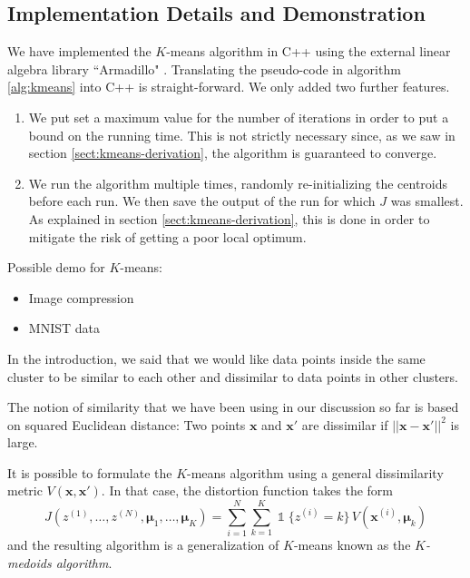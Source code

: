 \documentclass[final,3p,times,twocolumn]{elsarticle}
\let\bs\boldsymbol
\DeclareMathOperator*{\id}{\mathds{1}}
\begin{document}
\subsection{Implementation Details and Demonstration}
\label{sect:kmeans-code}
We have implemented the $K$-means algorithm in C++ using the external linear algebra library ``Armadillo" \cite{armadillo}.
Translating the pseudo-code in algorithm \ref{alg:kmeans} into C++ is straight-forward.
We only added two further features.
\begin{enumerate}
\item We put set a maximum value for the number of iterations in order to put a bound on the running time.
This is not strictly necessary since, as we saw in section \ref{sect:kmeans-derivation}, the algorithm is guaranteed to converge.
\item We run the algorithm multiple times, randomly re-initializing the centroids before each run.
We then save the output of the run for which $J$ was smallest.
As explained in section \ref{sect:kmeans-derivation}, this is done in order to mitigate the risk of getting a poor local optimum.
\end{enumerate}

Possible demo for $K$-means:
\begin{itemize}
\item Image compression
\item MNIST data
\end{itemize}


\label{sect:kmeans-concl}
In the introduction, we said that we would like data points inside the same cluster to be similar to each other and dissimilar to data points in other clusters.

The notion of similarity that we have been using in our discussion so far is based on squared Euclidean distance:
Two points $\bs x$ and $\bs x'$ are dissimilar if $||\bs x-\bs x'||^2$ is large.

It is possible to formulate the $K$-means algorithm using a general dissimilarity metric $V(\boldsymbol x, \boldsymbol x')$.
In that case, the distortion function takes the form
\begin{equation}
\label{eqn:kmedoid-distortion}
J(z^{(1)},\dots,z^{(N)},\bs \mu_1,\dots,\bs \mu_K) = \sum_{i=1}^N \sum_{k=1}^K \id\{z^{(i)}=k\}\,V(\bs x^{(i)}, \bs \mu_k)
\end{equation}
and the resulting algorithm is a generalization of $K$-means known as the \emph{$K$-medoids algorithm}.
\end{document}
